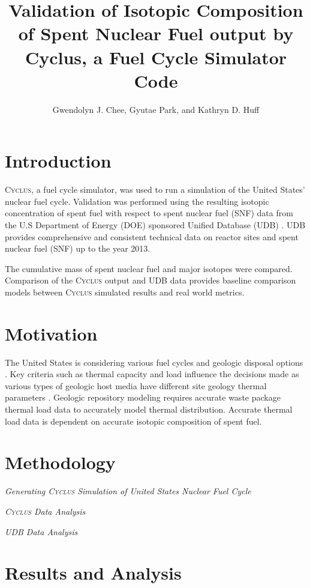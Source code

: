 \documentclass{anstrans}
\title{Validation of Isotopic Composition of Spent Nuclear Fuel output by Cyclus, a Fuel Cycle Simulator Code}
\author{Gwendolyn J. Chee, Gyutae Park, and Kathryn D. Huff}
\institute{
Dept. of Nuclear, Plasma and Radiological Engineering, University of Illinois at Urbana-Champaign \\
gchee2@illinois.edu
}
\newcommand{\Cyclus}{\textsc{Cyclus}\xspace}%
\begin{document}
\section{Introduction}
\Cyclus \cite{huff_fundamentals_2016}, a fuel cycle simulator, was used to run a simulation of the
United States' nuclear fuel cycle. Validation was performed using the resulting isotopic
concentration of spent fuel with respect to spent nuclear fuel (SNF) data from the U.S Department of
Energy (DOE) sponsored Unified Database (UDB) \cite{Peterson_UNF_2017}.  UDB provides
comprehensive and consistent technical data on reactor sites and spent nuclear fuel (SNF) up to the
year 2013.

The cumulative mass of spent nuclear fuel and major isotopes were compared. Comparison of the
\Cyclus output and UDB data provides baseline comparison models between \Cyclus simulated
results and real world metrics.

\section{Motivation}
The United States is considering various fuel cycles and geologic disposal options
\cite{DOE_strategy_2013}. Key criteria such as thermal capacity and load influence the decisions
made as various types of geologic host media have different site geology thermal parameters
\cite{huff_dynamic_2013}. Geologic repository modeling requires accurate waste package thermal
load data to accurately model thermal distribution. Accurate thermal load data is dependent on
accurate isotopic composition of spent fuel. 



\section{Methodology}
\noindent 
\textit{Generating \Cyclus Simulation of United States Nuclear Fuel Cycle}

\noindent 
\textit{\Cyclus Data Analysis}

\noindent 
\textit{UDB Data Analysis}




\section{Results and Analysis}
\end{document}
